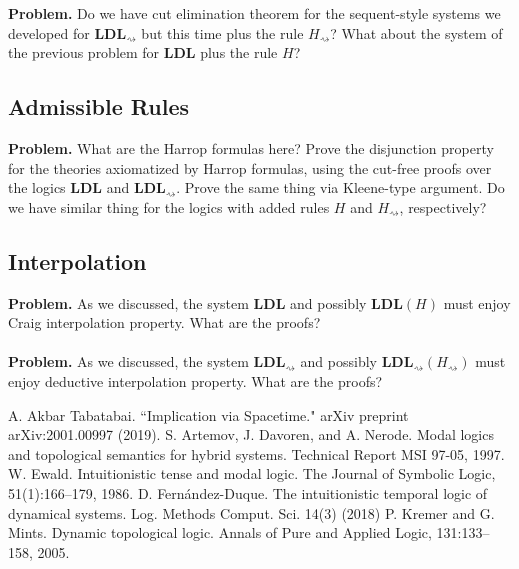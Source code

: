 \documentclass[12pt,a4paper]{article}
\theoremstyle{plain}
\theoremstyle{definition}
\begin{document}
\textbf{Problem.} Do we have cut elimination theorem for the sequent-style systems we developed for $\mathbf{LDL}_{\rightsquigarrow}$ but this time plus the rule $H_{\rightsquigarrow}$? What about the system of the previous problem for $\mathbf{LDL}$ plus the rule $H$?
\subsection{Admissible Rules}
\textbf{Problem.} What are the Harrop formulas here? Prove the disjunction property for the theories axiomatized by Harrop formulas, using the cut-free proofs over the logics $\mathbf{LDL}$ and $\mathbf{LDL}_{\rightsquigarrow}$. Prove the same thing via Kleene-type argument. Do we have similar thing for the logics with added rules $H$ and $H_{\rightsquigarrow}$, respectively?
\subsection{Interpolation}
\textbf{Problem.} As we discussed, the system $\mathbf{LDL}$ and possibly $\mathbf{LDL}(H)$ must enjoy Craig interpolation property. What are the proofs?\\
\\
\textbf{Problem.} As we discussed, the system $\mathbf{LDL}_{\rightsquigarrow}$ and possibly $\mathbf{LDL}_{\rightsquigarrow}(H_{\rightsquigarrow})$ must enjoy deductive interpolation property. What are the proofs?

\begin{thebibliography}{99}

A. Akbar Tabatabai. ``Implication via Spacetime." arXiv preprint arXiv:2001.00997 (2019).
S. Artemov, J. Davoren, and A. Nerode. Modal logics and topological semantics for hybrid systems. Technical Report MSI 97-05, 1997.
W. Ewald. Intuitionistic tense and modal logic. The Journal of Symbolic Logic, 51(1):166–179, 1986.
D. Fernández-Duque. The intuitionistic temporal logic of dynamical systems. Log. Methods Comput. Sci. 14(3) (2018)
P. Kremer and G. Mints. Dynamic topological logic. Annals of Pure and Applied Logic, 131:133–158, 2005.

\end{thebibliography}
\end{document}
